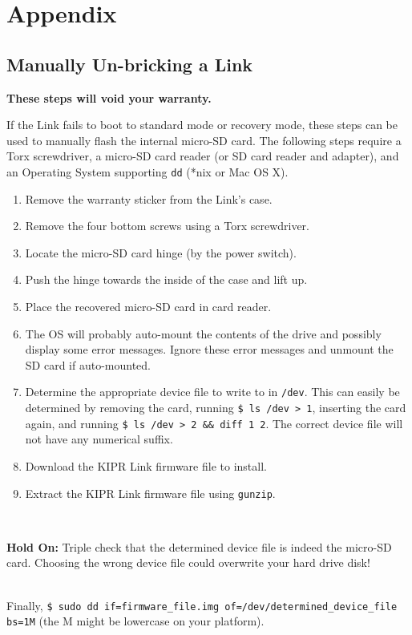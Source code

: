 \documentclass[12pt,letterpaper]{article}
\newcommand{\bcolorbox}[4]{\noindent \\ \fcolorbox{#1}{#2} {\parbox{\textwidth}{\vspace{.1em}\textbf{#3} #4\vspace{.1em}}} \\}
\newcommand{\whoathere}[1]{\bcolorbox{red}{MistyRose}{Hold On:}{#1}}
\begin{document}
	
	\section{Appendix}
	
	\subsection{Manually Un-bricking a Link}
	\noindent \textbf{These steps will void your warranty.}
	
	\noindent If the Link fails to boot to standard mode or recovery mode, these steps can be used to manually flash the internal micro-SD card. The following steps require a Torx screwdriver, a micro-SD card reader (or SD card reader and adapter), and an Operating System supporting \texttt{dd} (*nix or Mac OS X).
	
	\begin{enumerate}
		\setlength{\itemsep}{0em}
		\item Remove the warranty sticker from the Link's case.
		\item Remove the four bottom screws using a Torx screwdriver.
		\item Locate the micro-SD card hinge (by the power switch).
		\item Push the hinge towards the inside of the case and lift up.
		\item Place the recovered micro-SD card in card reader.
		\item The OS will probably auto-mount the contents of the drive and
		possibly display some error messages. Ignore these error messages and
		unmount the SD card if auto-mounted.
		\item Determine the appropriate device file to write to in \texttt{/dev}.
		This can easily be determined by removing the card,
		running \texttt{\$ ls /dev > 1}, inserting the card again, 
		and running \texttt{\$ ls /dev > 2 \&\& diff 1 2}. The correct
		device file will not have any numerical suffix.
		\item Download the KIPR Link firmware file to install.
		\item Extract the KIPR Link firmware file using \texttt{gunzip}.
	\end{enumerate}
	
	\whoathere{Triple check that the determined device file is indeed the micro-SD card.
	Choosing the wrong device file could overwrite your hard drive disk!}
	
	\noindent Finally, \texttt{\$ sudo dd if=firmware\_file.img of=/dev/determined\_device\_file bs=1M}
		(the M might be lowercase on your platform).
	
	\vspace{\fill}
	
\end{document}
